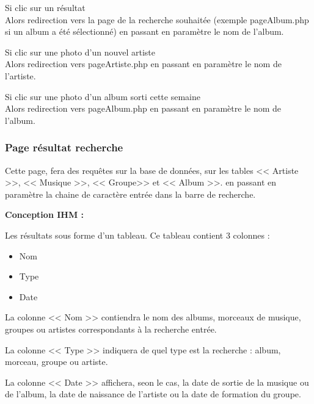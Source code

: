 			\begin{paragraphe}
				Si clic sur un résultat \\
				Alors redirection vers la page de la recherche souhaitée (exemple pageAlbum.php si un album a été sélectionné) en passant en paramètre le nom de l'album.
			\end{paragraphe}

			\begin{paragraphe}
				Si clic sur une photo d'un nouvel artiste \\
				Alors redirection vers pageArtiste.php en passant en paramètre le nom de l'artiste.
			\end{paragraphe}

			\begin{paragraphe}
				Si clic sur une photo d'un album sorti cette semaine \\
				Alors redirection vers pageAlbum.php en passant en paramètre le nom de l'album.
			\end{paragraphe}

		\subsubsection{Page résultat recherche}

			\begin{paragraphe}
				Cette page, fera des requêtes sur la base de données, sur les tables << Artiste >>, << Musique >>, << Groupe>> et << Album >>. en passant en paramètre la chaine de caractère entrée dans la barre de recherche.
			\end{paragraphe}

			\begin{paragraphe}
				\textbf{Conception IHM :}
			\end{paragraphe}

			\begin{paragraphe}
				Les résultats sous forme d'un tableau. Ce tableau contient 3 colonnes :
				\begin{itemize}
					\item Nom
					\item Type
					\item Date
				\end{itemize}
				La colonne << Nom >> contiendra le nom des albums, morceaux de musique, groupes ou artistes correspondants à la recherche entrée.\par
				La colonne << Type >> indiquera de quel type est la recherche : album, morceau, groupe ou artiste.\par
				La colonne << Date >> affichera, seon le cas, la date de sortie de la musique ou de l'album, la date de naissance de l'artiste ou la date de formation du groupe.
			\end{paragraphe}


